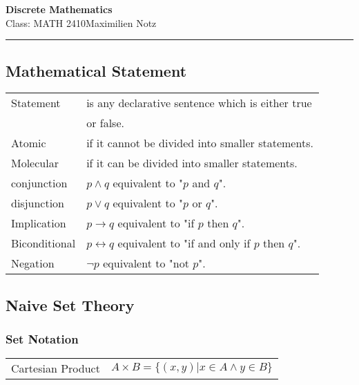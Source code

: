 \documentclass[5pt]{article}
\begin{document}
\begin{center}
     \Large{\textbf{Discrete Mathematics}}\\
     \small{Class: MATH 2410}\hfill\small{\textcopyright Maximilien Notz \the\year{}}
     \noindent\rule{20.2cm}{0.4pt}
\end{center}


\begin{multicols}{2}
\setcounter{secnumdepth}{0}


\subsection{Mathematical Statement}
\begin{tabular}{ll}
    Statement       & is any declarative sentence which is either true\\
                    & or false.\\
    Atomic          & if it cannot be divided into smaller statements.\\
    Molecular       & if it can be divided into smaller statements.\\
    conjunction     & $p\land q$ equivalent to "$p$ and $q$".\\
    disjunction     & $p\lor q$ equivalent to "$p$ or $q$".\\
    Implication     & $p\rightarrow q$ equivalent to "if $p$ then $q$".\\
    Biconditional   & $p\leftrightarrow q$ equivalent to "if and only if $p$ then $q$".\\
    Negation        & $\lnot p$ equivalent to "not $p$".\\
    
\end{tabular}

\subsection{Naive Set Theory}
\subsubsection{Set Notation}
\begin{tabular}{ll}







    Cartesian Product & $A\times B=\{(x,y)|x\in A\land y \in B\}$
    

\end{tabular}
\end{multicols}
\end{document}
